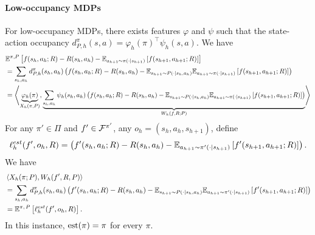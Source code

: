 \paragraph{Low-occupancy MDPs} For low-occupancy MDPs, there exists features $\varphi$ and $\psi$ such that the state-action occupancy $d^\pi_{P,h}(s,a) = \varphi_h(\pi)^\top \psi_h(s, a)$. We have 
 \begin{align*}
     &\E^{\pi, P}\left[f(s_h, a_h; R) - R(s_h, a_h) - \E_{a_{h+1} \sim \pi(\cdot|s_{h+1})}\left[f(s_{h+1}, a_{h+1}; R)\right]\right]
     \\&= \sum_{s_h,a_h} d_{P, h}^\pi(s_h,a_h)\left(f(s_h, a_h; R) - R(s_h, a_h) - \E_{s_{h+1} \sim P(\cdot|s_h, a_h)}\E_{a_{h+1} \sim \pi(\cdot|s_{h+1})}\left[f(s_{h+1}, a_{h+1}; R)\right]\right)
     \\&= \scalebox{0.96}{$\displaystyle\left\langle \underbrace{\varphi_h(\pi)}_{X_h(\pi, P)}, 
     \underbrace{\sum_{s_h, a_h} \psi_h(s_h, a_h)\left(f(s_h, a_h; R) - R(s_h, a_h) - \E_{s_{h+1} \sim P(\cdot|s_h, a_h)}\E_{a_{h+1} \sim \pi(\cdot|s_{h+1})}\left[f(s_{h+1}, a_{h+1}; R)\right]\right)}_{W_h(f, R; P)}\right\rangle $}
 \end{align*}
For any $\pi' \in \Pi$ and $f' \in \mathcal{F}^{\pi'}$, any $o_h = (s_h, a_h, s_{h+1})$, define $$\ell^{est}_h(f', o_h, R) = \left(f'(s_h, a_h; R) - R(s_h, a_h) - \mathbb{E}_{a_{h+1} \sim \pi'(\cdot|s_{h+1})}\left[f'(s_{h+1}, a_{h+1}; R)\right]\right).$$
We have
\begin{align*}
    &\left\langle X_h(\pi; P), W_h(f', R, P)\right\rangle
    \\&= \sum_{s_h,a_h} d_{P, h}^\pi(s_h, a_h)\left(f'(s_h, a_h; R) - R(s_h, a_h) - \mathbb{E}_{s_{h+1} \sim P(\cdot|s_h, a_h)}\mathbb{E}_{a_{h+1} \sim \pi'(\cdot|s_{h+1})}\left[f'(s_{h+1}, a_{h+1}; R)\right]\right)
    \\&= \mathbb{E}^{\pi,\, P}\left[\ell^{est}_h(f', o_h, R)\right].
\end{align*}
In this instance, $\operatorname*{est}(\pi) = \pi$ for every $\pi$.





